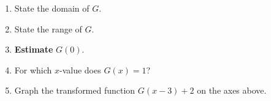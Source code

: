 \documentclass[12pt]{article}
\renewcommand{\emph}[1]{\textsf{\textbf{#1}}}
\newcounter{probcount}
\newcounter{subprobcount}
\newenvironment{subproblems}{%
\begin{enumerate}%
\setcounter{enumi}{\value{subprobcount}}%
\renewcommand{\theenumi}{\emph{\alph{enumi}}}}%
{\setcounter{subprobcount}{\value{enumi}}\end{enumerate}}
\begin{document}
\begin{subproblems}
\item State the domain of $G$. \hfill \underline{\hspace{2in}} \\
  \vfill
\item State the range of $G$. \hfill \underline{\hspace{2in}} \\
  \vfill
\item \textbf{Estimate} $G(0)$. \hfill \underline{\hspace{2in}} \\
  \vfill
\item For which $x$-value does $G(x)=1$? \hfill \underline{\hspace{2in}} \\
  \vfill
\item Graph the transformed function $G(x-3)+2$ on the axes above. \\
  \vfill
\end{subproblems}
\end{document}
